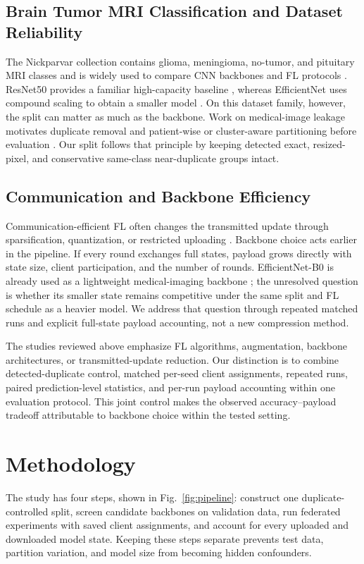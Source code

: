 \documentclass[conference]{IEEEtran}
\begin{document}
\subsection{Brain Tumor MRI Classification and Dataset Reliability}
The Nickparvar collection contains glioma, meningioma, no-tumor, and pituitary MRI classes and is widely used to compare CNN backbones and FL protocols \cite{nickparvar_brain_tumor_mri,bentemessek2025brain,khatoon2026resnet50,ghanta2025federated}. ResNet50 provides a familiar high-capacity baseline \cite{he2016resnet}, whereas EfficientNet uses compound scaling to obtain a smaller model \cite{tan2019efficientnet}. On this dataset family, however, the split can matter as much as the backbone. Work on medical-image leakage motivates duplicate removal and patient-wise or cluster-aware partitioning before evaluation \cite{melo2026exploiting,siam2026brain}. Our split follows that principle by keeping detected exact, resized-pixel, and conservative same-class near-duplicate groups intact.

\subsection{Communication and Backbone Efficiency}
Communication-efficient FL often changes the transmitted update through sparsification, quantization, or restricted uploading \cite{radhika2026communication,aniket2025cfl,zhou2022communication,das2026federated}. Backbone choice acts earlier in the pipeline. If every round exchanges full states, payload grows directly with state size, client participation, and the number of rounds. EfficientNet-B0 is already used as a lightweight medical-imaging backbone \cite{tan2019efficientnet,abubakr2026explainable}; the unresolved question is whether its smaller state remains competitive under the same split and FL schedule as a heavier model. We address that question through repeated matched runs and explicit full-state payload accounting, not a new compression method.

The studies reviewed above emphasize FL algorithms, augmentation, backbone architectures, or transmitted-update reduction. Our distinction is to combine detected-duplicate control, matched per-seed client assignments, repeated runs, paired prediction-level statistics, and per-run payload accounting within one evaluation protocol. This joint control makes the observed accuracy--payload tradeoff attributable to backbone choice within the tested setting.

\section{Methodology}
The study has four steps, shown in Fig.~\ref{fig:pipeline}: construct one duplicate-controlled split, screen candidate backbones on validation data, run federated experiments with saved client assignments, and account for every uploaded and downloaded model state. Keeping these steps separate prevents test data, partition variation, and model size from becoming hidden confounders.
\end{document}
